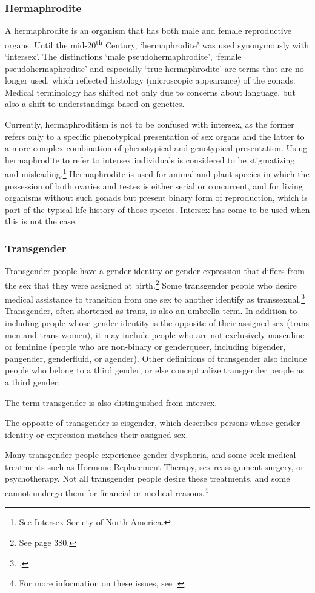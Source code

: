 \subsubsection{Hermaphrodite}
\label{hermaphrodite}
A hermaphrodite is an organism that has both male and female reproductive organs. Until the mid-20\textsuperscript{th} Century, `hermaphrodite' was used synonymously with `intersex'. The distinctions `male pseudohermaphrodite', `female pseudohermaphrodite' and especially `true hermaphrodite' are terms that are no longer used, which reflected histology (microscopic appearance) of the gonads. Medical terminology has shifted not only due to concerns about language, but also a shift to understandings based on genetics.

Currently, hermaphroditism is not to be confused with intersex, as the former refers only to a specific phenotypical presentation of sex organs and the latter to a more complex combination of phenotypical and genotypical presentation. Using hermaphrodite to refer to intersex individuals is considered to be stigmatizing and misleading.\footnote{See \href{https://web.archive.org/web/20130701061246/http://www.isna.org/faq/hermaphrodite}{Intersex Society of North America}.} Hermaphrodite is used for animal and plant species in which the possession of both ovaries and testes is either serial or concurrent, and for living organisms without such gonads but present binary form of reproduction, which is part of the typical life history of those species. Intersex has come to be used when this is not the case.

\subsubsection{Transgender}
Transgender people have a gender identity or gender expression that differs from the sex that they were assigned at birth.\footnote{See \cite{altilio} page 380.} Some transgender people who desire medical assistance to transition from one sex to another identify as transsexual.\footnote{\cite{polly}.} Transgender, often shortened as trans, is also an umbrella term. In addition to including people whose gender identity is the opposite of their assigned sex (trans men and trans women), it may include people who are not exclusively masculine or feminine (people who are non-binary or genderqueer, including bigender, pangender, genderfluid, or agender). Other definitions of transgender also include people who belong to a third gender, or else conceptualize transgender people as a third gender.

The term transgender is also distinguished from intersex. 

The opposite of transgender is cisgender, which describes persons whose gender identity or expression matches their assigned sex.

Many transgender people experience gender dysphoria, and some seek medical treatments such as Hormone Replacement Therapy, sex reassignment surgery, or psychotherapy. Not all transgender people desire these treatments, and some cannot undergo them for financial or medical reasons.\footnote{For more information on these issues, see \cite{maizes}.}
